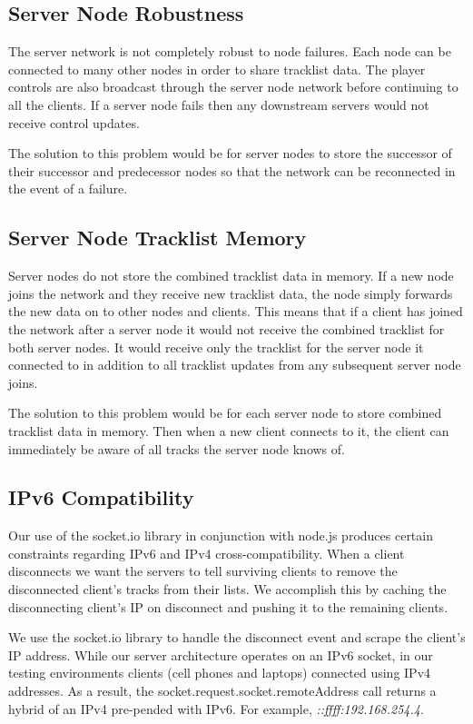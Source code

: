 \documentclass[12pt]{article}
\begin{document}
\subsection{Server Node Robustness}
The server network is not completely robust to node failures. Each node can be connected to many other nodes in order to share tracklist data. The player controls are also broadcast through the server node network before continuing to all the clients. If a server node fails then any downstream servers would not receive control updates.

The solution to this problem would be for server nodes to store the successor of their successor and predecessor nodes so that the network can be reconnected in the event of a failure.

\subsection{Server Node Tracklist Memory}
Server nodes do not store the combined tracklist data in memory. If a new node joins the network and they receive new tracklist data, the node simply forwards the new data on to other nodes and clients. This means that if a client has joined the network after a server node it would not receive the combined tracklist for both server nodes. It would receive only the tracklist for the server node it connected to in addition to all tracklist updates from any subsequent server node joins.

The solution to this problem would be for each server node to store combined tracklist data in memory. Then when a new client connects to it, the client can immediately be aware of all tracks the server node knows of.

\subsection{IPv6 Compatibility}
Our use of the socket.io library in conjunction with node.js produces certain constraints regarding IPv6 and IPv4 cross-compatibility.  When a client disconnects we want the servers to tell surviving clients to remove the disconnected client's tracks from their lists. We accomplish this by caching the disconnecting client's IP on disconnect and pushing it to the remaining clients.

We use the socket.io library to handle the disconnect event and scrape the client's IP address. While our server architecture operates on an IPv6 socket, in our testing environments clients (cell phones and laptops) connected using IPv4 addresses. As a result, the socket.request.socket.remoteAddress call returns a hybrid of an IPv4 pre-pended with IPv6. For example, \textit{::ffff:192.168.254.4}.
\end{document}
